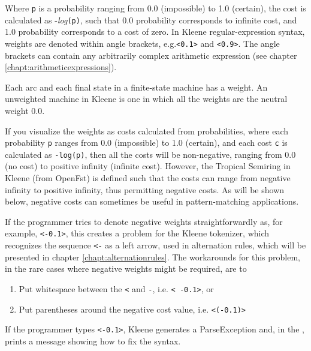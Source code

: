 \noindent
Where \texttt{p} is a probability ranging from 0.0 (impossible) to
1.0 (certain), the cost is calculated as -\emph{log}\texttt{(p)},
such that 0.0 probability corresponds to infinite cost, and 1.0
probability corresponds to a cost of zero.
In Kleene regular-expression syntax, weights are denoted within angle brackets,
e.g.\@ \texttt{<0.1>} and \texttt{<0.9>}.  The angle brackets can contain any
arbitrarily complex arithmetic expression (see chapter
\ref{chapt:arithmeticexpressions}).

Each arc and each final state in a finite-state machine has a weight.  An unweighted
machine in Kleene is one in which all the weights are the neutral weight 0.0.

If you visualize the weights as costs calculated from probabilities, where each
probability \texttt{p} ranges from 0.0 (impossible) to 1.0 (certain), and each cost
\texttt{c} is calculated as \texttt{-log(p)}, then all the costs will be non-negative,
ranging from 0.0 (no cost) to positive infinity (infinite cost).  However, the Tropical
Semiring in Kleene (from OpenFst) is defined such that the costs can range from negative
infinity to positive infinity, thus permitting negative costs.  As will be shown below,
negative costs can sometimes be useful in pattern-matching applications.

If the programmer tries to
denote negative weights straightforwardly as, for example, \@ \texttt{<-0.1>}, this
creates a problem for the Kleene tokenizer, which recognizes the
sequence \texttt{<-} as a left arrow, used in alternation rules, which
will be presented in chapter \ref{chapt:alternationrules}.
The workarounds for this problem, in the rare cases where negative
weights might be required,
are to

\begin{enumerate}
\item
Put whitespace between the \texttt{<} and \texttt{-}, i.e.\@
\texttt{< -0.1>}, or
\item
Put parentheses around the negative cost value, i.e.\@
\texttt{<(-0.1)>}
\end{enumerate}

\noindent
If the programmer types \texttt{<-0.1>}, Kleene generates a
ParseException and, in the , prints a message showing how
to fix the syntax.

